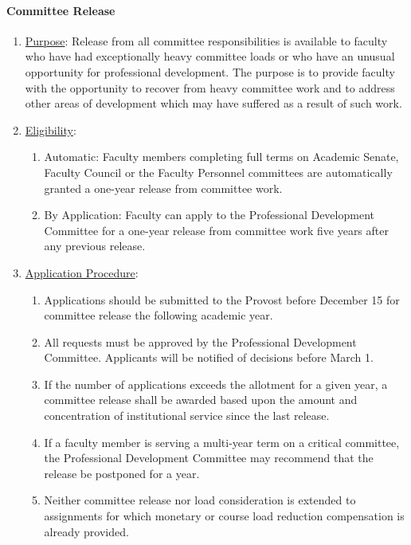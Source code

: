 			\paragraph{Committee Release}
				\label{sec:CommitteeRelease}
				\begin{enumerate}[label=\alph*)]
					\item{\underline{Purpose}:  Release from all committee responsibilities is available to faculty who have had exceptionally heavy committee loads or who have an unusual opportunity for professional development.  The purpose is to provide faculty with the opportunity to recover from heavy committee work and to address other areas of development which may have suffered as a result of such work.}
					\item{\underline{Eligibility}:
						\begin{enumerate}[label=\arabic*)]
							\label{sec:CommitteeRelease-Eligibility}
							\item{
								\label{sec:CommitteeRelease-Eligibility-Automatic}
								Automatic:  Faculty members completing full terms on Academic Senate, Faculty Council or the Faculty Personnel committees are automatically granted a one-year release from committee work.}
							\item{By Application:  Faculty can apply to the Professional Development Committee for a one-year release from committee work five years after any previous release.}
						\end{enumerate}
					}
					\item{\underline{Application Procedure}: 
						\begin{enumerate}[label=\arabic*)]
							\item{Applications should be submitted to the Provost before December 15 for committee release the following academic year.}
							\item{All requests must be approved by the Professional Development Committee.  Applicants will be notified of decisions before March 1.}
							\item{If the number of applications exceeds the allotment for a given year, a committee release shall be awarded based upon the amount and concentration of institutional service since the last release.}
							\item{If a faculty member is serving a multi-year term on a critical committee, the Professional Development Committee may recommend that the release be postponed for a year.}
							\item{Neither committee release nor load consideration is extended to assignments for which monetary or course load reduction compensation is already provided.}
						\end{enumerate}
					}
				\end{enumerate}

